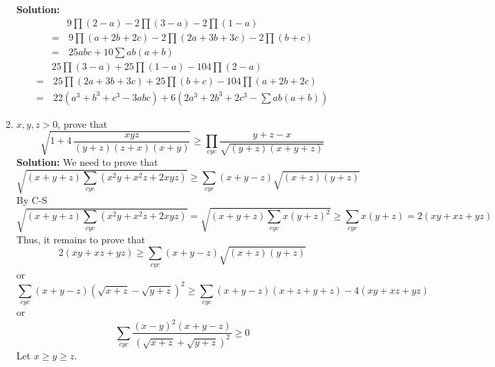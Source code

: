 \documentclass{report}
\begin{document}
\begin{enumerate}
	\textbf{Solution:}\begin{align*}&9\prod{(2-a)}-2\prod{(3-a)}-2\prod{(1-a)}\\ =&\, 9\prod{(a+2b+2c)}-2\prod{(2a+3b+3c)}-2\prod{(b+c)}\\=&\,25abc+10\sum{ab(a+b)}\end{align*} \begin{align*}&25\prod{(3-a)}+25\prod{(1-a)}-104\prod{(2-a)}\\=&\, 25\prod{(2a+3b+3c)}+25\prod{(b+c)}-104\prod{(a+2b+2c)}\\=&\, 22(a^3+b^3+c^3-3abc)+6(2a^3+2b^3+2c^3-\sum{ab(a+b)})\end{align*}
	\begin{flushright}
	\end{flushright}
	\item $x,y,z>0$, prove that$$\sqrt {1+4\,{\frac {xyz}{ \left( y+z \right)  \left( z+x \right)\left( x+y \right) }}}\geq \prod \limits_{cyc}{\frac {y+z-x}{\sqrt { \left( y+z \right)\left( x+y+z \right) }}}$$
	\textbf{Solution:} We need to prove that $$\sqrt{(x+y+z)\sum_{cyc}(x^2y+x^2z+2xyz)}\geq\sum_{cyc}(x+y-z)\sqrt{(x+z)(y+z)}$$By C-S$$\sqrt{(x+y+z)\sum_{cyc}(x^2y+x^2z+2xyz)}=\sqrt{(x+y+z)\sum_{cyc}x(y+z)^2}\geq\sum_{cyc}x(y+z)=2(xy+xz+yz)$$Thus, it remains to prove that$$2(xy+xz+yz)\geq\sum_{cyc}(x+y-z)\sqrt{(x+z)(y+z)}$$or$$\sum_{cyc}(x+y-z)\left(\sqrt{x+z}-\sqrt{y+z}\right)^2\geq\sum_{cyc}(x+y-z)(x+z+y+z)-4(xy+xz+yz)$$ or$$\sum_{cyc}\frac{(x-y)^2(x+y-z)}{\left(\sqrt{x+z}+\sqrt{y+z}\right)^2}\geq0$$Let $x\geq y\geq z$.
	

\end{enumerate}
\end{document}

